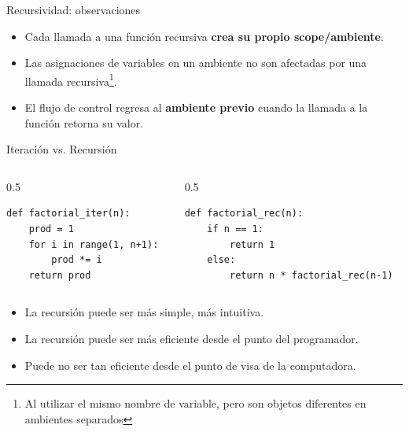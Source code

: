 \documentclass[mathserif]{beamer}
\begin{document}
\begin{frame}[fragile]{Recursividad: observaciones}
    \begin{itemize}
        \item Cada llamada a una función recursiva {\blue\bfseries crea su propio scope/ambiente}.
        
        \item Las asignaciones de variables en un ambiente no son afectadas por una llamada recursiva\footnote{\small Al utilizar el mismo nombre de variable, pero son objetos diferentes en ambientes separados}.
        
        \item El flujo de control regresa al {\orange\bfseries ambiente previo} cuando la llamada a la función retorna su valor.
    \end{itemize}
\end{frame}

\begin{frame}[fragile]{Iteración vs. Recursión}
    \begin{columns}
        \begin{column}{0.5\textwidth}
\begin{lstlisting}[basicstyle=\linespread{1}\footnotesize\ttfamily]
def factorial_iter(n):
    prod = 1
    for i in range(1, n+1):
        prod *= i
    return prod
\end{lstlisting}
        \end{column}
        \begin{column}{0.5\textwidth}
\begin{lstlisting}[basicstyle=\linespread{1}\footnotesize\ttfamily]
def factorial_rec(n): 
    if n == 1:
        return 1 
    else:
        return n * factorial_rec(n-1)
\end{lstlisting}        
        \end{column}
    \end{columns}
    
    \begin{itemize}
        \item La recursión puede ser más simple, más intuitiva.
        \item La recursión {\orange puede ser más eficiente} desde el punto del programador.
        \item Puede {\orange no ser tan eficiente} desde el punto de visa de la computadora.
    \end{itemize}
\end{frame}
\end{document}
